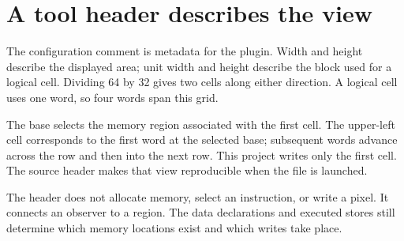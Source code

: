 \section{A tool header describes the
  view}\label{002-single-pixel-p01-a-tool-header-describes-the-view}

The configuration comment is metadata for the plugin. Width and height
describe the displayed area; unit width and height describe the block
used for a logical cell. Dividing 64 by 32 gives two cells along either
direction. A logical cell uses one word, so four words span this grid.

The base selects the memory region associated with the first cell. The
upper-left cell corresponds to the first word at the selected base;
subsequent words advance across the row and then into the next row. This
project writes only the first cell. The source header makes that view
reproducible when the file is launched.

The header does not allocate memory, select an instruction, or write a
pixel. It connects an observer to a region. The data declarations and
executed stores still determine which memory locations exist and which
writes take place.
